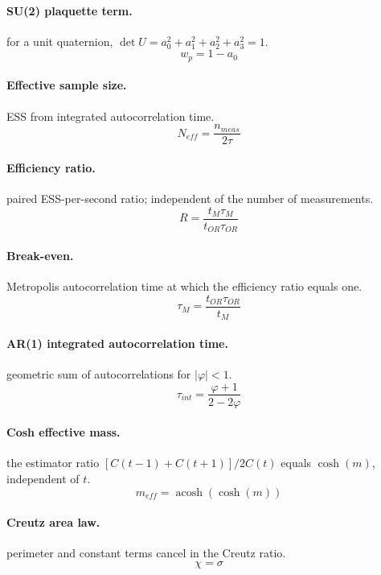 \documentclass[11pt]{article}
\begin{document}
\paragraph{SU(2) plaquette term.} for a unit quaternion, $\det U = a_{0}^{2} + a_{1}^{2} + a_{2}^{2} + a_{3}^{2} = 1$.
\begin{equation}
  w_{p} = 1 - a_{0}
\end{equation}
\paragraph{Effective sample size.} ESS from integrated autocorrelation time.
\begin{equation}
  N_{eff} = \frac{n_{meas}}{2 \tau}
\end{equation}
\paragraph{Efficiency ratio.} paired ESS-per-second ratio; independent of the number of measurements.
\begin{equation}
  R = \frac{t_{M} \tau_{M}}{t_{OR} \tau_{OR}}
\end{equation}
\paragraph{Break-even.} Metropolis autocorrelation time at which the efficiency ratio equals one.
\begin{equation}
  \tau_{M} = \frac{t_{OR} \tau_{OR}}{t_{M}}
\end{equation}
\paragraph{AR(1) integrated autocorrelation time.} geometric sum of autocorrelations for $|\varphi|<1$.
\begin{equation}
  \tau_{int} = \frac{\varphi + 1}{2 - 2 \varphi}
\end{equation}
\paragraph{Cosh effective mass.} the estimator ratio $[C(t-1)+C(t+1)]/2C(t)$ equals $\cosh{\left(m \right)}$, independent of $t$.
\begin{equation}
  m_{eff} = \operatorname{acosh}{\left(\cosh{\left(m \right)} \right)}
\end{equation}
\paragraph{Creutz area law.} perimeter and constant terms cancel in the Creutz ratio.
\begin{equation}
  \chi = \sigma
\end{equation}
\end{document}
